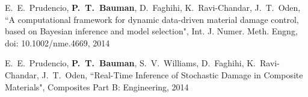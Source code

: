 E.~E.~Prudencio, \textbf{P.~T.~Bauman}, D.~Faghihi, K.~Ravi-Chandar, J.~T.~Oden,
``A computational framework for dynamic data-driven material damage control,
based on Bayesian inference and model selection",
Int. J. Numer. Meth. Engng, doi: 10.1002/nme.4669, 2014

\blankline

E.~E.~Prudencio, \textbf{P.~T.~Bauman}, S.~V.~Williams, D.~Faghihi, K.~Ravi-Chandar,
J.~T.~Oden,
``Real-Time Inference of Stochastic Damage in Composite Materials", Composites Part B: Engineering, 2014

